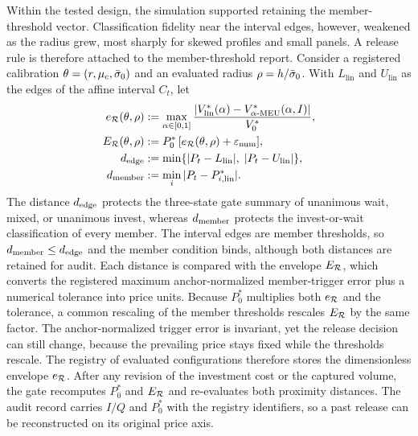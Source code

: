 Within the tested design, the simulation supported retaining the member-threshold vector. Classification fidelity near the interval edges, however, weakened as the radius grew, most sharply for skewed profiles and small panels. A release rule is therefore attached to the member-threshold report. Consider a registered calibration $\theta=(r,\mu_c,\bar{\sigma}_0)$ and an evaluated radius $\rho=h/\bar{\sigma}_0$. With $L_{\mathrm{lin}}$ and $U_{\mathrm{lin}}$ as the edges of the affine interval $C_t$, let
\begin{equation}
\begin{aligned}
e_{\mathcal{R}}(\theta,\rho)&:=\max_{\alpha\in[0,1]}\frac{\lvert V^{*}_{\mathrm{lin}}(\alpha)-V^{*}_{\alpha\text{-MEU}}(\alpha,I)\rvert}{V^{*}_{0}},\\
E_{\mathcal{R}}(\theta,\rho)&:=P^{*}_{0}\,[e_{\mathcal{R}}(\theta,\rho)+\varepsilon_{\mathrm{num}}],\\
d_{\mathrm{edge}}&:=\min\{\lvert P_t-L_{\mathrm{lin}}\rvert,\;\lvert P_t-U_{\mathrm{lin}}\rvert\},\\
d_{\mathrm{member}}&:=\min_i\,\lvert P_t-P^{*}_{i,\mathrm{lin}}\rvert.
\end{aligned}
\label{eq:safeguard}
\end{equation}
The distance $d_{\mathrm{edge}}$ protects the three-state gate summary of unanimous wait, mixed, or unanimous invest, whereas $d_{\mathrm{member}}$ protects the invest-or-wait classification of every member. The interval edges are member thresholds, so $d_{\mathrm{member}}\le d_{\mathrm{edge}}$ and the member condition binds, although both distances are retained for audit. Each distance is compared with the envelope $E_{\mathcal{R}}$, which converts the registered maximum anchor-normalized member-trigger error plus a numerical tolerance into price units. Because $P^{*}_{0}$ multiplies both $e_{\mathcal{R}}$ and the tolerance, a common rescaling of the member thresholds rescales $E_{\mathcal{R}}$ by the same factor. The anchor-normalized trigger error is invariant, yet the release decision can still change, because the prevailing price stays fixed while the thresholds rescale. The registry of evaluated configurations therefore stores the dimensionless envelope $e_{\mathcal{R}}$. After any revision of the investment cost or the captured volume, the gate recomputes $P^{*}_{0}$ and $E_{\mathcal{R}}$ and re-evaluates both proximity distances. The audit record carries $I/Q$ and $P^{*}_{0}$ with the registry identifiers, so a past release can be reconstructed on its original price axis.

